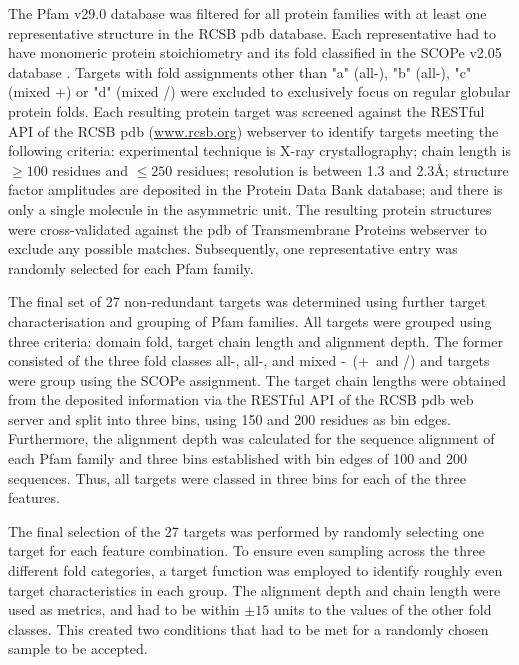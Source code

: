 The Pfam v29.0 \cite{Finn2016-tz} database was filtered for all protein families with at least one representative structure in the RCSB \gls{pdb} \cite{Berman2000-qj} database. Each representative had to have monomeric protein stoichiometry and its fold classified in the SCOPe v2.05 database \cite{Chandonia2017-bd}. Targets with fold assignments other than "a" (all-\textalpha), "b" (all-\textbeta), "c" (mixed \textalpha+\textbeta) or "d" (mixed \textalpha/\textbeta) were excluded to exclusively focus on regular globular protein folds. Each resulting protein target was screened against the RESTful API of the RCSB \gls{pdb} (\url{www.rcsb.org}) webserver to identify targets meeting the following criteria: experimental technique is X-ray crystallography; chain length is $\geq100$ residues and $\leq250$ residues; resolution is between 1.3 and 2.3\AA; structure factor amplitudes are deposited in the Protein Data Bank \cite{Berman2000-qj} database; and there is only a single molecule in the asymmetric unit. The resulting protein structures were cross-validated against the \acrlong{pdb} of Transmembrane Proteins \cite{Tusnady2005-lp} webserver to exclude any possible matches. Subsequently, one representative entry was randomly selected for each Pfam family.

The final set of 27 non-redundant targets was determined using further target characterisation and grouping of Pfam families. All targets were grouped using three criteria: domain fold, target chain length and alignment depth. The former consisted of the three fold classes all-\textalpha, all-\textbeta, and mixed \textalpha-\textbeta\ (\textalpha+\textbeta\ and \textalpha/\textbeta) and targets were group using the SCOPe assignment. The target chain lengths were obtained from the deposited information via the RESTful API of the RCSB \gls{pdb} web server and split into three bins, using 150 and 200 residues as bin edges. Furthermore, the alignment depth was calculated for the sequence alignment of each Pfam family and three bins established with bin edges of 100 and 200 sequences. Thus, all targets were classed in three bins for each of the three features. 

The final selection of the 27 targets was performed by randomly selecting one target for each feature combination. To ensure even sampling across the three different fold categories, a target function was employed to identify roughly even target characteristics in each group. The alignment depth and chain length were used as metrics, and had to be within $\pm15$ units to the values of the other fold classes. This created two conditions that had to be met for a randomly chosen sample to be accepted.

